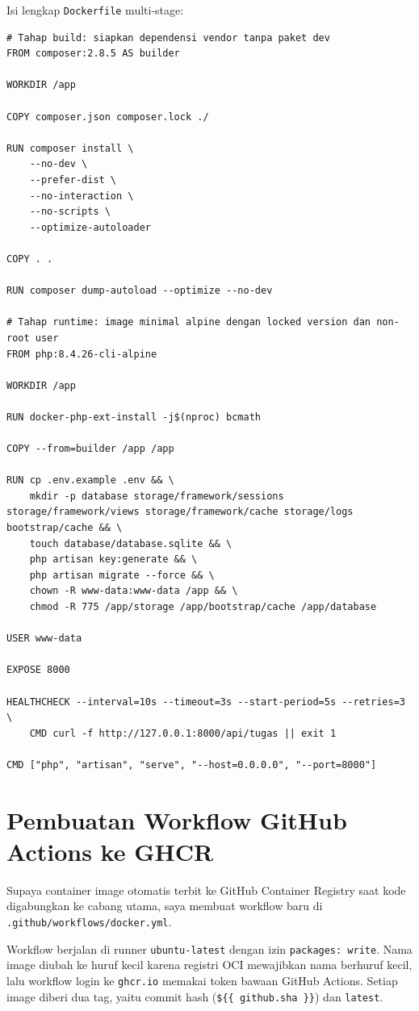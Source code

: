 \documentclass[a4paper,oneside,12pt]{report}
\begin{document}
Isi lengkap \texttt{Dockerfile} multi-stage:

\begin{lstlisting}[style=dockerstyle,caption={Dockerfile multi-stage dengan versi Alpine terkunci dan pengguna non-root.}]
# Tahap build: siapkan dependensi vendor tanpa paket dev
FROM composer:2.8.5 AS builder

WORKDIR /app

COPY composer.json composer.lock ./

RUN composer install \
    --no-dev \
    --prefer-dist \
    --no-interaction \
    --no-scripts \
    --optimize-autoloader

COPY . .

RUN composer dump-autoload --optimize --no-dev

# Tahap runtime: image minimal alpine dengan locked version dan non-root user
FROM php:8.4.26-cli-alpine

WORKDIR /app

RUN docker-php-ext-install -j$(nproc) bcmath

COPY --from=builder /app /app

RUN cp .env.example .env && \
    mkdir -p database storage/framework/sessions storage/framework/views storage/framework/cache storage/logs bootstrap/cache && \
    touch database/database.sqlite && \
    php artisan key:generate && \
    php artisan migrate --force && \
    chown -R www-data:www-data /app && \
    chmod -R 775 /app/storage /app/bootstrap/cache /app/database

USER www-data

EXPOSE 8000

HEALTHCHECK --interval=10s --timeout=3s --start-period=5s --retries=3 \
    CMD curl -f http://127.0.0.1:8000/api/tugas || exit 1

CMD ["php", "artisan", "serve", "--host=0.0.0.0", "--port=8000"]
\end{lstlisting}

\section{Pembuatan Workflow GitHub Actions ke GHCR}
Supaya container image otomatis terbit ke GitHub Container Registry saat kode digabungkan ke cabang utama, saya membuat workflow baru di \texttt{.github/workflows/docker.yml}.

Workflow berjalan di runner \texttt{ubuntu-latest} dengan izin \texttt{packages: write}. Nama image diubah ke huruf kecil karena registri OCI mewajibkan nama berhuruf kecil, lalu workflow login ke \texttt{ghcr.io} memakai token bawaan GitHub Actions. Setiap image diberi dua tag, yaitu commit hash (\texttt{\$\{\{ github.sha \}\}}) dan \texttt{latest}.
\end{document}
